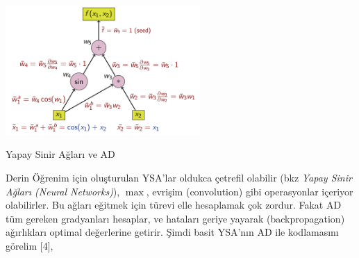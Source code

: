 \documentclass[12pt,fleqn]{article}\usepackage{../../common}
\begin{document}
\includegraphics[width=20em]{autodiff_05.png}

Yapay Sinir Ağları ve AD

Derin Öğrenim için oluşturulan YSA'lar oldukca çetrefil olabilir (bkz {\em
  Yapay Sinir Ağları (Neural Networks)}), $\max$, evrişim (convolution)
gibi operasyonlar içeriyor olabilirler. Bu ağları eğitmek için türevi elle
hesaplamak çok zordur. Fakat AD tüm gereken gradyanları hesaplar, ve
hataları geriye yayarak (backpropagation) ağırlıkları optimal değerlerine
getirir. Şimdi basit YSA'nın AD ile kodlamasını görelim [4],
\end{document}
